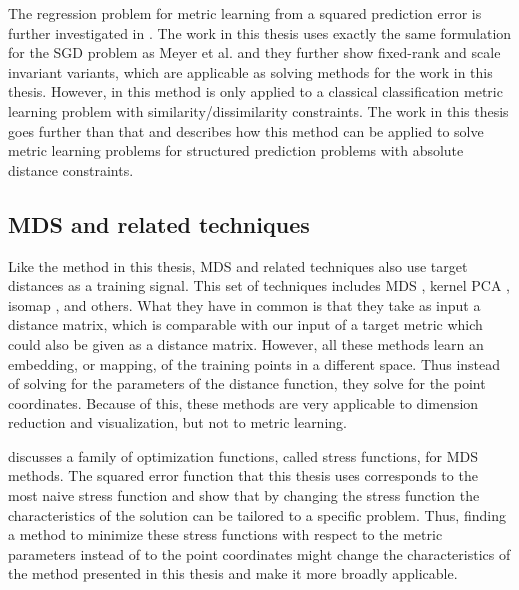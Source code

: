 The regression problem for metric learning from a squared prediction error is further investigated in \cite{meyer2011regression}. The work in this thesis uses exactly the same formulation for the \ac{SGD} problem as Meyer et al. and they further show fixed-rank and scale invariant variants, which are applicable as solving methods for the work in this thesis. However, in \cite{meyer2011regression} this method is only applied to a classical classification metric learning problem with similarity/dissimilarity constraints. The work in this thesis goes further than that and describes how this method can be applied to solve metric learning problems for structured prediction problems with absolute distance constraints.


\subsection{MDS and related techniques}

Like the method in this thesis, \acf{MDS} and related techniques also use target distances as a training signal. This set of techniques includes \ac{MDS} \cite{venna2006local, chen2009local, chen2013stress}, kernel PCA \cite{scholkopf1997kernel}, isomap \cite{tenenbaum2000global}, and others. What they have in common is that they take as input a distance matrix, which is comparable with our input of a target metric which could also be given as a distance matrix. However, all these methods learn an embedding, or mapping, of the training points in a different space. Thus instead of solving for the parameters of the distance function, they solve for the point coordinates. Because of this, these methods are very applicable to dimension reduction and visualization, but not to metric learning.

\cite{chen2013stress} discusses a family of optimization functions, called stress functions, for \ac{MDS} methods. The squared error function that this thesis uses corresponds to the most naive stress function and \cite{chen2013stress} show that by changing the stress function the characteristics of the solution can be tailored to a specific problem. Thus, finding a method to minimize these stress functions with respect to the metric parameters instead of to the point coordinates might change the characteristics of the method presented in this thesis and make it more broadly applicable.



